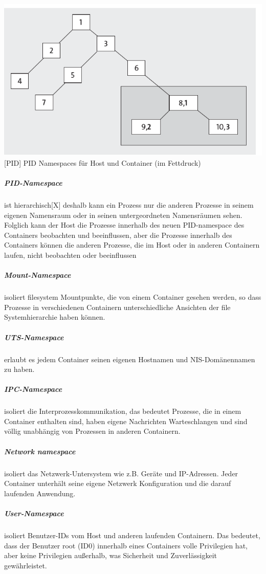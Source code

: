 \vspace{1em}
\begin{minipage}{\linewidth}
	\centering
	\includegraphics[width=1\linewidth]{pics/PID.PNG}
	[PID]{ PID Namespaces für Host und Container (im Fettdruck) \cite{Liebel2017SkalierbareContainer-Infrastrukturen}}
	\label{fig:PID}
\end{minipage}

\subparagraph{PID-Namespace} ist hierarchisch[X] deshalb kann ein Prozess nur die anderen Prozesse in seinem eigenen Namensraum oder in seinen untergeordneten Namensräumen sehen. Folglich kann der Host die Prozesse innerhalb des neuen PID-namespace des Containers beobachten und beeinflussen, aber die Prozesse innerhalb des Containers können die anderen Prozesse, die im Host oder in anderen Containern laufen, nicht beobachten oder beeinflussen

\subparagraph{Mount-Namespace} isoliert filesystem Mountpunkte, die von einem Container gesehen werden, so dass Prozesse in verschiedenen Containern unterschiedliche Ansichten der file Systemhierarchie haben können.

\subparagraph{UTS-Namespace} erlaubt es jedem Container seinen eigenen Hostnamen und NIS-Domänennamen zu haben.

\subparagraph{IPC-Namespace} isoliert die Interprozesskommunikation, das bedeutet Prozesse, die in einem Container enthalten sind, haben eigene Nachrichten Warteschlangen und sind völlig unabhängig von Prozessen in anderen Containern.

\subparagraph{Network namespace} isoliert das Netzwerk-Untersystem wie z.B. Geräte und IP-Adressen. Jeder Container unterhält seine eigene Netzwerk Konfiguration und die darauf laufenden Anwendung.

\subparagraph{User-Namespace} isoliert Benutzer-IDs vom Host und anderen laufenden Containern. Das bedeutet, dass der Benutzer root (ID0) innerhalb eines Containers volle Privilegien hat, aber keine Privilegien außerhalb, was Sicherheit und Zuverlässigkeit gewährleistet. \cite{Xavier2015AClouds}
	



